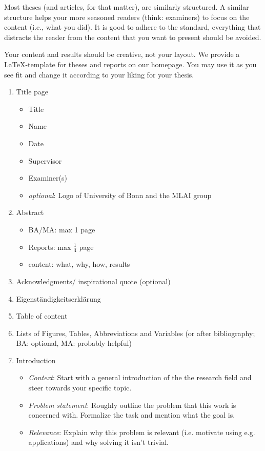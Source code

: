 \documentclass[twocolumn]{mlai-guide}
\begin{document}
Most theses (and articles, for that matter), are similarly structured. 
A similar structure helps your more seasoned readers (think: examiners) to focus on the content (i.e., what you did). 
It is good to adhere to the standard, everything that distracts the reader from the content that you want to present should be avoided.

Your content and results should be creative, not your layout.
We provide a \LaTeX-template for theses and reports on our homepage.
You may use it as you see fit and change it according to your liking for your thesis.


\begin{enumerate}
	\item Title page
		\begin{itemize}
			\item Title
			\item Name
			\item Date
			\item Supervisor
			\item Examiner(s)
			\item \emph{optional}: Logo of University of Bonn and the MLAI group
		\end{itemize}
	\item Abstract
		\begin{itemize}
			\item BA/MA: max 1 page
			\item Reports: max $\frac{1}{4}$ page
			\item content: what, why, how, results
		\end{itemize}
	\item Acknowledgments/ inspirational quote (optional)
	\item Eigenständigkeitserklärung
	\item Table of content
	\item Lists of Figures, Tables, Abbreviations and Variables (or after bibliography; BA: optional, MA: probably helpful)
	\item Introduction
		\begin{itemize}
			\item \emph{Context}: Start with a general introduction of the the research field and steer towards your specific topic. 
			\item \emph{Problem statement}: Roughly outline the problem that this work is concerned with. Formalize the task and mention what the goal is. 
			\item \emph{Relevance}: Explain why this problem is relevant (i.e. motivate using e.g. applications) and why solving it isn't trivial. 

\end{itemize}
\end{enumerate}
\end{document}
